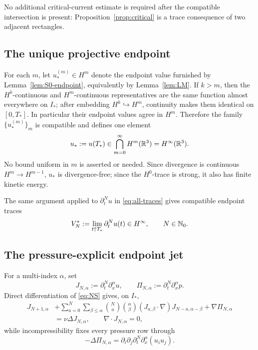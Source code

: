 No additional critical-current estimate is required after the compatible
intersection is present: Proposition~\ref{prop:critical} is a trace consequence
of two adjacent rectangles.

\subsection{The unique projective endpoint}

For each \(m\), let \(u_*^{(m)}\in H^m\) denote the endpoint value furnished
by Lemma~\ref{lem:S0-endpoint}, equivalently by Lemma~\ref{lem:LM}. If
\(k>m\), then the \(H^k\)-continuous and \(H^m\)-continuous representatives
are the same function almost everywhere on \(I_*\); after embedding
\(H^k\hookrightarrow H^m\), continuity makes them identical on
\([0,T_*]\). In particular their endpoint values agree in \(H^m\).
Therefore the family \(\{u_*^{(m)}\}_m\) is compatible and defines one element
\begin{equation}
 u_*:=u(T_*)\in\bigcap_{m=0}^{\infty}H^m(\mathbb R^3)=H^\infty(\mathbb R^3).
 \label{eq:endpoint}
\end{equation}
No bound uniform in \(m\) is asserted or needed. Since divergence is
continuous \(H^m\to H^{m-1}\), \(u_*\) is divergence-free; since the
\(H^0\)-trace is strong, it also has finite kinetic energy.

The same argument applied to \(\partial_t^N u\) in \eqref{eq:all-traces}
gives compatible endpoint traces
\begin{equation}
 V_N^*:=\lim_{t\uparrow T_*}\partial_t^Nu(t)\in H^\infty,
 \qquad N\in\mathbb N_0.
 \label{eq:velocity-jet-traces}
\end{equation}

\subsection{The pressure-explicit endpoint jet}

For a multi-index \(\alpha\), set
\[
 J_{N,\alpha}:=\partial_t^N\partial_x^\alpha u,
 \qquad
 \Pi_{N,\alpha}:=\partial_t^N\partial_x^\alpha p.
\]
Direct differentiation of \eqref{eq:NS} gives, on \(I_*\),
\begin{equation}
\begin{aligned}
 J_{N+1,\alpha}
 &+
 \sum_{a=0}^{N}\sum_{\beta\leq\alpha}
 \binom Na\binom\alpha\beta
 (J_{a,\beta}\cdot\nabla)
 J_{N-a,\alpha-\beta}
 +\nabla\Pi_{N,\alpha}
 \\
 &=\nu\Delta J_{N,\alpha},
 \qquad \nabla\cdot J_{N,\alpha}=0,
\end{aligned}
\label{eq:full-binomial}
\end{equation}
while incompressibility fixes every pressure row through
\begin{equation}
 -\Delta\Pi_{N,\alpha}
 =\partial_i\partial_j\partial_t^N\partial_x^\alpha(u_i u_j).
 \label{eq:pressure-poisson-jet}
\end{equation}

